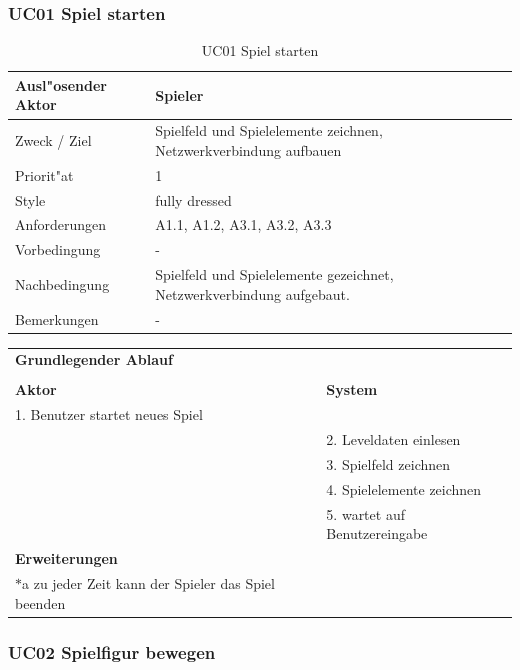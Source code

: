 \subsubsection{UC01 Spiel starten}

\begin{table}[H]
  \begin{center}
    \begin{tabular}{|p{40mm}|p{90mm}|}
    \hline Ausl"osender Aktor & Spieler  \\
    \hline Zweck / Ziel & Spielfeld und Spielelemente zeichnen, Netzwerkverbindung aufbauen  \\
    \hline Priorit"at & 1 \\
    \hline Style & fully dressed \\
    \hline Anforderungen &  A1.1, A1.2, A3.1, A3.2, A3.3\\
    \hline Vorbedingung & - \\
    \hline Nachbedingung & Spielfeld und Spielelemente gezeichnet, Netzwerkverbindung aufgebaut. \\
    \hline Bemerkungen & - \\
    \hline
    \end{tabular}
  \end{center}
  \caption{UC01 Spiel starten}
\end{table}


\begin{center}
  \begin{tabular}{p{65mm} p{65mm}}
  \multicolumn{2}{l}{\textbf{Grundlegender Ablauf}} \\
  & \\
  \textbf{Aktor} & \textbf{System} \\
  1. Benutzer startet neues Spiel &  \\
  &  2. Leveldaten einlesen  \\
  &  3. Spielfeld zeichnen \\
  &  4. Spielelemente zeichnen \\
  &  5. wartet auf Benutzereingabe\\
  \multicolumn{2}{l}{\textbf{Erweiterungen}} \\
  \(\ast\)a zu jeder Zeit kann der Spieler das Spiel beenden & \\
  \end{tabular}
\end{center}


\subsubsection{UC02 Spielfigur bewegen}

